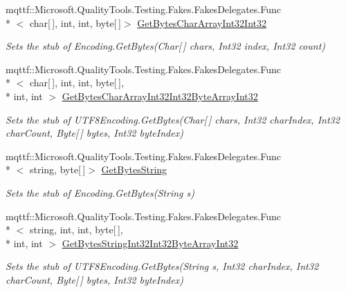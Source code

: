 \begin{DoxyCompactItemize}
mqttf\-::\-Microsoft.\-Quality\-Tools.\-Testing.\-Fakes.\-Fakes\-Delegates.\-Func\\*
$<$ char\mbox{[}$\,$\mbox{]}, int, int, byte\mbox{[}$\,$\mbox{]}$>$ \hyperlink{class_system_1_1_text_1_1_fakes_1_1_stub_u_t_f8_encoding_aeef82a1b68e51f853838945f98aa84b5}{Get\-Bytes\-Char\-Array\-Int32\-Int32}
\begin{DoxyCompactList}\small\item\em Sets the stub of Encoding.\-Get\-Bytes(\-Char\mbox{[}$\,$\mbox{]} chars, Int32 index, Int32 count)\end{DoxyCompactList}\item 
mqttf\-::\-Microsoft.\-Quality\-Tools.\-Testing.\-Fakes.\-Fakes\-Delegates.\-Func\\*
$<$ char\mbox{[}$\,$\mbox{]}, int, int, byte\mbox{[}$\,$\mbox{]}, \\*
int, int $>$ \hyperlink{class_system_1_1_text_1_1_fakes_1_1_stub_u_t_f8_encoding_a81a42b7bb6d8d39719318e0eb63a4525}{Get\-Bytes\-Char\-Array\-Int32\-Int32\-Byte\-Array\-Int32}
\begin{DoxyCompactList}\small\item\em Sets the stub of U\-T\-F8\-Encoding.\-Get\-Bytes(\-Char\mbox{[}$\,$\mbox{]} chars, Int32 char\-Index, Int32 char\-Count, Byte\mbox{[}$\,$\mbox{]} bytes, Int32 byte\-Index)\end{DoxyCompactList}\item 
mqttf\-::\-Microsoft.\-Quality\-Tools.\-Testing.\-Fakes.\-Fakes\-Delegates.\-Func\\*
$<$ string, byte\mbox{[}$\,$\mbox{]}$>$ \hyperlink{class_system_1_1_text_1_1_fakes_1_1_stub_u_t_f8_encoding_aebb1b7fb4eb0a87d4401976dad74c0ff}{Get\-Bytes\-String}
\begin{DoxyCompactList}\small\item\em Sets the stub of Encoding.\-Get\-Bytes(\-String s)\end{DoxyCompactList}\item 
mqttf\-::\-Microsoft.\-Quality\-Tools.\-Testing.\-Fakes.\-Fakes\-Delegates.\-Func\\*
$<$ string, int, int, byte\mbox{[}$\,$\mbox{]}, \\*
int, int $>$ \hyperlink{class_system_1_1_text_1_1_fakes_1_1_stub_u_t_f8_encoding_aa4a15e4f6997718c49b0cdcdfd49a450}{Get\-Bytes\-String\-Int32\-Int32\-Byte\-Array\-Int32}
\begin{DoxyCompactList}\small\item\em Sets the stub of U\-T\-F8\-Encoding.\-Get\-Bytes(\-String s, Int32 char\-Index, Int32 char\-Count, Byte\mbox{[}$\,$\mbox{]} bytes, Int32 byte\-Index)\end{DoxyCompactList}\item 

\end{DoxyCompactItemize}
